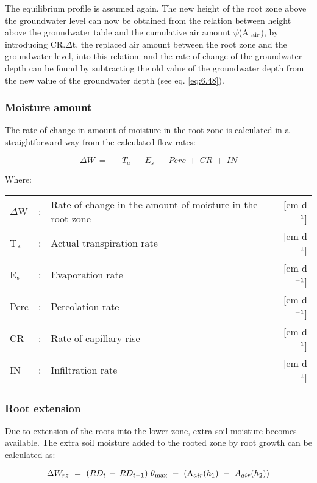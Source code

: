 The equilibrium profile is assumed again. The new height of the root zone above the
groundwater level can now be obtained from the relation between height above the
groundwater table and the cumulative air amount $\psi$(A $_{{\rm air}}$), by introducing CR.$\Delta$t, 
the replaced air amount between the root zone and the groundwater level, into this relation.
and the rate of change of the groundwater depth can be found by subtracting the old value
of the groundwater depth from the new value of the groundwater depth (see eq. \ref{eq:6.48}). 

\subsubsection{Moisture amount}
The rate of change in amount of moisture in the root zone is calculated in a straightforward 
way from the calculated flow rates:

\begin{equation}
\label{eq:6.53}
\Delta W ~=~ -\, T _{a} ~-~ E _{s} ~-~ Perc ~+~ CR ~+~ IN
\end{equation}

Where:\\[5pt]
\begin{tabularx}{\textwidth}{llXr}
$\Delta$W &:& Rate of change in the amount of moisture in the root zone  & [cm d$^{{\rm -1}}$]\\
T$_{{\rm a}}$ &:& Actual transpiration rate  & [cm d$^{{\rm -1}}$]\\
E$_{{\rm s}}$ &:& Evaporation rate  & [cm d$^{{\rm -1}}$]\\
Perc &:& Percolation rate  & [cm d$^{{\rm -1}}$]\\
CR &:& Rate of capillary rise  & [cm d$^{{\rm -1}}$]\\
IN &:& Infiltration rate  & [cm d$^{{\rm -1}}$]\\
\end{tabularx}

\subsubsection{Root extension}
Due to extension of the roots into the lower zone, extra soil moisture becomes available.
The extra soil moisture added to the rooted zone by root growth can be calculated as:

\begin{equation}
\label{eq:6.54}
\Delta W_{rz} ~=~(RD _{t} \, -\, RD _{t-1} )~\theta _{\max } ~-~({\rm A} _{air} (h _{1} )~-~A _{air} (h _{2} ))  
\end{equation}

